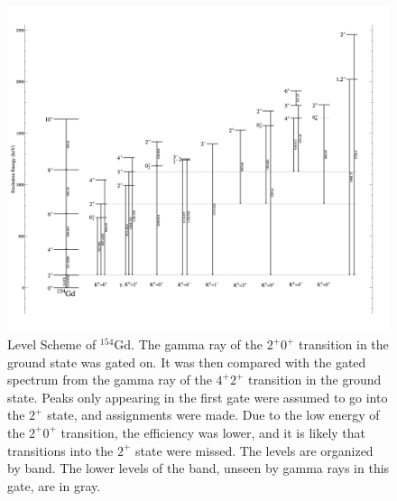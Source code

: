 \begin{figure}[!]
    \centering
    \includegraphics[scale=0.18]{154GdTablesAndFigs/154Gd_2to0.png}
    \caption{Level Scheme of $^{154}$Gd. The gamma ray of the $2^+$\rightarrow$0^+$ transition in the ground state was gated on. It was then compared with the gated spectrum from the gamma ray of the $4^+$\rightarrow$2^+$ transition in the ground state. Peaks only appearing in the first gate were assumed to go into the $2^+$ state, and assignments were made. Due to the low energy of the $2^+$\rightarrow$0^+$ transition, the efficiency was lower, and it is likely that transitions into the $2^+$ state were missed. The levels are organized by band. The lower levels of the band, unseen by gamma rays in this gate, are in gray.}
    \label{fig:154_2to0}
\end{figure}

